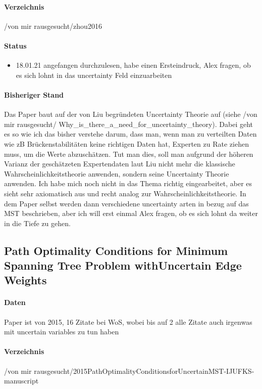 \documentclass[paper=a4,10pt]{scrartcl}
\begin{document}
\paragraph{Verzeichnis} /von mir rausgesucht/zhou2016
\paragraph{Status}
\begin{itemize}
\item 18.01.21 angefangen durchzulesen, habe einen Ersteindruck, Alex fragen, ob es sich lohnt in das uncertainty Feld einzuarbeiten
\end{itemize}
\paragraph{Bisheriger Stand} Das Paper baut auf der von Liu begründeten Uncertainty Theorie auf (siehe /von mir rausgesucht/ Why\_is\_there\_a\_need\_for\_uncertainty\_theory). Dabei geht es so wie ich das bisher verstehe darum, dass man, wenn man zu verteilten Daten wie zB Brückenstabilitäten keine richtigen Daten hat, Experten zu Rate ziehen muss, um die Werte abzuschätzen. Tut man dies, soll man aufgrund der höheren Varianz der geschätzeten Expertendaten laut Liu nicht mehr die klassische Wahrscheinlichkeitstheorie anwenden, sondern seine Uncertainty Theorie anwenden. Ich habe mich noch nicht in das Thema richtig eingearbeitet, aber es sieht sehr axiomatisch aus und recht analog zur Wahrscheinlichkeitstheorie. 
In dem Paper selbst werden dann verschiedene uncertainty arten in bezug auf das MST beschrieben, aber ich will erst einmal Alex fragen, ob es sich lohnt da weiter in die Tiefe zu gehen. 

\subsection{Path Optimality Conditions for Minimum Spanning Tree Problem withUncertain Edge Weights}
\label{sec:paper_path_opt_uncertain}
\paragraph{Daten} Paper ist von 2015, 16 Zitate bei WoS, wobei bis auf 2 alle Zitate auch irgenwas mit uncertain variables zu tun haben
\paragraph{Verzeichnis} /von mir rausgesucht/2015PathOptimalityConditionsforUncertainMST-IJUFKS-manuscript
\end{document}
